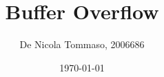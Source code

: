 \documentclass[12pt,a4paper,oneside]{article}
\title{
Buffer Overflow
}	                                    %
\author{
De Nicola Tommaso, 2006686
}				                %
\date{\today}									    %
\theoremstyle{definition}
\begin{document}

\newpage
\tableofcontents{}
\newpage

\clearpage

\clearpage

%
{\RaggedRight
}
\end{document}
